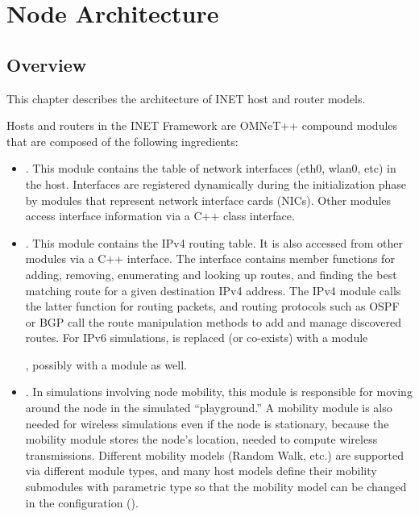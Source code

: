 \chapter{Node Architecture}
\label{cha:node-architecture}


\section{Overview}

This chapter describes the architecture of INET host and router models.

Hosts and routers in the INET Framework are OMNeT++ compound modules that
are composed of the following ingredients:

\begin{itemize}

\item {}. This module
contains the table of network interfaces (eth0, wlan0, etc) in the host.
Interfaces are registered dynamically during the initialization phase by
modules that represent network interface cards (NICs). Other modules access
interface information via a C++ class interface.

\item {}. This module contains
the IPv4 routing table. It is also accessed from other modules via a C++ interface.
The interface contains member functions for adding, removing, enumerating
and looking up routes, and finding the best matching route for a given
destination IPv4 address. The IPv4 module calls the latter function for
routing packets, and routing protocols such as OSPF or BGP call the route
manipulation methods to add and manage discovered routes. For IPv6
simulations,  is replaced (or co-exists) with
a  module

\iffalse TODO
; and for Mobile IPv6 simulations (xMIPv6 project [TODO])
\fi

, possibly with a  module
as well.

\iffalse TODO
\item \tbf{Notification Board (\nedtype{NotificationBoard})}. This module
makes it possible for several modules to communicate in a publish-subscribe
manner. Notifications include change notifications (``routing table
changed'') and state changes (``radio became idle'').
\fi

\item {}. In simulations involving node mobility, this
module is responsible for moving around the node in the simulated
``playground.'' A mobility module is also needed for wireless simulations
even if the node is stationary, because the mobility module stores the
node's location, needed to compute wireless transmissions. Different
mobility models (Random Walk, etc.) are supported via different module
types, and many host models define their mobility submodules with
parametric type so that the mobility model can be changed in the
configuration ().


\end{itemize}

